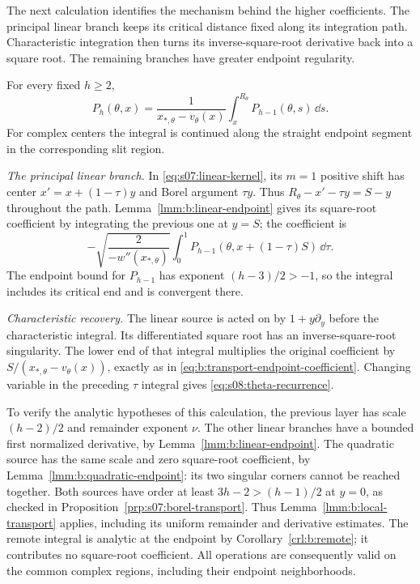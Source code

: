 The next calculation identifies the mechanism behind the higher
coefficients. The principal linear branch keeps its critical
distance fixed along its integration path. Characteristic
integration then turns its inverse-square-root derivative back
into a square root. The remaining branches have greater endpoint
regularity.

\begin{lmm}\label{lmm:s08:propagation}
For every fixed $h\geq2$,
\begin{equation}\label{eq:s08:theta-recurrence}
 P_h(\theta,x)
 =\frac1{x_{*,\theta}-v_\theta(x)}
                         \int_x^{R_\theta}P_{h-1}(\theta,s)\,\dd s.
\end{equation}
For complex centers the integral is continued along the straight
endpoint segment in the corresponding slit region.
\end{lmm}
\begin{prf}
\emph{The principal linear branch.}
In \eqref{eq:s07:linear-kernel}, its $m=1$ positive shift has
center $x'=x+(1-\tau)y$ and Borel argument $\tau y$.
Thus $R_\theta-x'-\tau y=S-y$ throughout the path.
Lemma~\ref{lmm:b:linear-endpoint} gives its square-root coefficient
by integrating the previous one at $y=S$; the coefficient is
\[
 -\sqrt{\frac{2}{-w''(x_{*,\theta})}}
            \int_0^1P_{h-1}(\theta,x+(1-\tau)S)\,\dd\tau.
\]
The endpoint bound for $P_{h-1}$ has exponent $(h-3)/2>-1$, so
the integral includes its critical end and is convergent there.

\smallskip\noindent
\emph{Characteristic recovery.}
The linear source is acted on by $1+y\partial_y$ before the
characteristic integral. Its differentiated square root has an
inverse-square-root singularity. The lower end of that integral
multiplies the original coefficient by
$S/(x_{*,\theta}-v_\theta(x))$, exactly as in
\eqref{eq:b:transport-endpoint-coefficient}.
Changing variable in the preceding $\tau$ integral gives
\eqref{eq:s08:theta-recurrence}.

To verify the analytic hypotheses of this calculation, the previous
layer has scale $(h-2)/2$ and remainder exponent $\nu$.
The other linear branches have a bounded first normalized derivative,
by Lemma~\ref{lmm:b:linear-endpoint}. The quadratic source has the
same scale and zero square-root coefficient, by
Lemma~\ref{lmm:b:quadratic-endpoint}: its two singular corners
cannot be reached together. Both sources have order at least
$3h-2>(h-1)/2$ at $y=0$, as checked in
Proposition~\ref{prp:s07:borel-transport}. Thus
Lemma~\ref{lmm:b:local-transport} applies, including its uniform
remainder and derivative estimates. The remote integral is analytic
at the endpoint by Corollary~\ref{crl:b:remote}; it contributes no
square-root coefficient. All operations are consequently valid on
the common complex regions, including their endpoint neighborhoods.
\end{prf}

